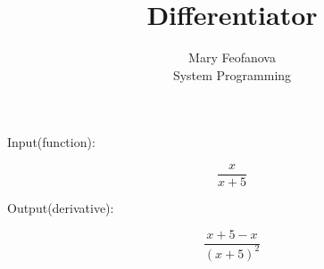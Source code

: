 \documentclass[12pt]{article}
\begin{document}
\title{Differentiator}
\author{Mary Feofanova\\
System Programming}
 
\maketitle
\begin{center}
Input(function):
\end{center}
$$\frac{x}{x+5}$$
\begin{center}
Output(derivative):
\end{center}
$$\frac{x+5-x}{(x+5)^2 }$$
\end{document}

